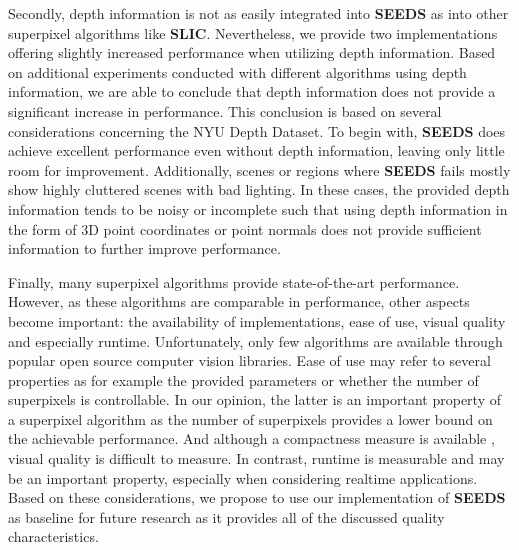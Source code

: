 Secondly, depth information is not as easily integrated into \textbf{SEEDS} as into other superpixel algorithms like \textbf{SLIC}. Nevertheless, we provide two implementations offering slightly increased performance when utilizing depth information. Based on additional experiments conducted with different algorithms using depth information, we are able to conclude that depth information does not provide a significant increase in performance. This conclusion is based on several considerations concerning the NYU Depth Dataset. To begin with, \textbf{SEEDS} does achieve excellent performance even without depth information, leaving only little room for improvement. Additionally, scenes or regions where \textbf{SEEDS} fails mostly show highly cluttered scenes with bad lighting. In these cases, the provided depth information tends to be noisy or incomplete such that using depth information in the form of 3D point coordinates or point normals does not provide sufficient information to further improve performance.

Finally, many superpixel algorithms provide state-of-the-art performance. However, as these algorithms are comparable in performance, other aspects become important: the availability of implementations, ease of use, visual quality and especially runtime. Unfortunately, only few algorithms are available through popular open source computer vision libraries. Ease of use may refer to several properties as for example the provided parameters or whether the number of superpixels is controllable. In our opinion, the latter is an important property of a superpixel algorithm as the number of superpixels provides a lower bound on the achievable performance. And although a compactness measure is available \cite{SchickFischerStiefelhagen:2012}, visual quality is difficult to measure. In contrast, runtime is measurable and may be an important property, especially when considering realtime applications. Based on these considerations, we propose to use our implementation of \textbf{SEEDS} as baseline for future research as it provides all of the discussed quality characteristics.


